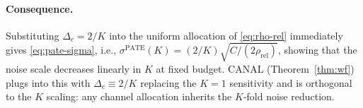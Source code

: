 \paragraph{Consequence.}
Substituting $\Delta_c = 2/K$ into the uniform allocation of
\eqref{eq:rho-rel} immediately gives \eqref{eq:pate-sigma}, i.e.,
$\sigma^{\mathrm{PATE}}(K) = (2/K)\sqrt{C/(2\rho_{\mathrm{rel}})}$,
showing that the noise scale decreases linearly in $K$ at fixed
budget. CANAL (Theorem~\ref{thm:wf}) plugs into this with $\Delta_c
\equiv 2/K$ replacing the $K\!=\!1$ sensitivity and is orthogonal to
the $K$ scaling: any channel allocation inherits the $K$-fold noise
reduction.

%
%
%
%
